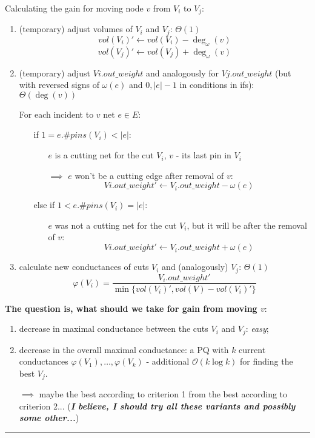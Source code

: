 \documentclass[acmsmall,nonacm,screen,review]{acmart}
\begin{document}
Calculating the gain for moving node $v$ from $V_i$ to $V_j$:
\begin{enumerate}
    \item 
(temporary) adjust volumes of $V_i$ and $V_j$: $\Theta(1)$
\[vol(V_i)' \xleftarrow{} vol(V_i) - \deg_\omega(v)\]
\[vol(V_j)' \xleftarrow{} vol(V_j) + \deg_\omega(v)\]
    \item 
(temporary) adjust $Vi.out\_weight$ and analogously for $Vj.out\_weight$ (but with reversed signs of $\omega(e)$ and $0, |e| - 1$ in conditions in ifs): $\Theta(\deg(v))$

For each incident to $v$ net $e \in E$:
\begin{itemize}
    \item[]
if $1 = e.\#pins(V_i) < |e|$: 
    \begin{itemize}
        \item[]
$e$ is a cutting net for the cut $V_i$, $v$ - its last pin in $V_i$

$\implies$ $e$ won't be a cutting edge after removal of $v$:
\[Vi.out\_weight' \xleftarrow{} V_i.out\_weight - \omega(e)\]
    \end{itemize}
    \item[]
else if $1 < e.\#pins(V_i) = |e|$:
\begin{itemize}
\item[]
$e$ was not a cutting net for the cut $V_i$, but it will be after the removal of $v$:
\[Vi.out\_weight' \xleftarrow{} V_i.out\_weight + \omega(e)\]
    \end{itemize}
\end{itemize}

\item
calculate new conductances of cuts $V_i$ and (analogously) $V_j$: $\Theta(1)$
\[\varphi(V_i) = \frac{V_i.out\_weight'}{\min\{vol(V_i)', vol(V) - vol(V_i)'\}}\]
\end{enumerate}

\medskip
\textbf{The question is, what should we take for gain from moving $v$}:
\begin{enumerate}
    \item 
decrease in maximal conductance between the cuts $V_i$ and $V_j$: \textit{easy};
    \item 
decrease in the overall maximal conductance: a PQ with $k$ current conductances $\varphi(V_1), \dots, \varphi(V_k)$ - additional $\mathcal{O}(k \log k)$ for finding the best $V_j$.
    \item[$\implies$] maybe the best according to criterion 1 from the best according to criterion 2... (\textbf{\textit{I believe, I should try all these variants and possibly some other...}})
\end{enumerate}
\hrule
\end{document}

